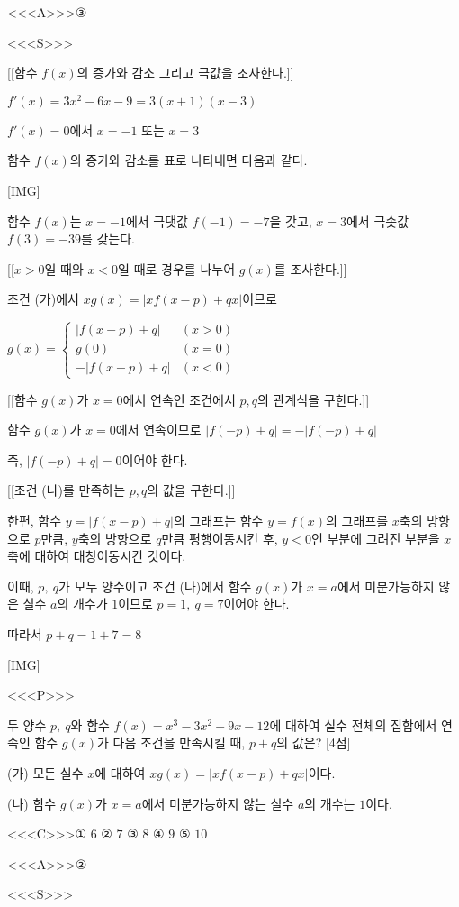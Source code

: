 \documentclass{oblivoir}
\begin{document}
<<<A>>>③

<<<S>>>

[[함수 $f(x)$의 증가와 감소 그리고 극값을 조사한다.]]

$f'(x)$$=3x^{2}-6x-9$$=3(x+1)(x-3)$

$f'(x)=0$에서 $x=-1$ 또는 $x=3$

함수 $f(x)$의 증가와 감소를 표로 나타내면 다음과 같다.

[IMG]

함수 $f(x)$는 $x=-1$에서 극댓값 $f(-1)=-7$을 갖고, $x=3$에서 극솟값 $f(3)=-39$를 갖는다.

[[$x>0$일 때와 $x<0$일 때로 경우를 나누어 $g(x)$를 조사한다.]]

조건 (가)에서 $xg(x)= | xf(x-p)+qx |$이므로

$g(x)=\begin{cases}
| f(x-p)+q |&(x>0)\\
g(0)&(x=0)\\
- | f(x-p)+q |&(x< 0)
\end{cases}$

[[함수 $g(x)$가 $x=0$에서 연속인 조건에서 $p,q$의 관계식을 구한다.]]

함수 $g(x)$가 $x=0$에서 연속이므로 $| f(-p)+q | =- | f(-p)+q |$

즉, $| f(-p)+q | =0$이어야 한다.

[[조건 (나)를 만족하는  $p,q$의 값을 구한다.]]

한편, 함수 $y= | f(x-p)+q |$의 그래프는 함수 $y=f(x)$의 그래프를 $x$축의 방향으로 $p$만큼, $y$축의 방향으로 $q$만큼 평행이동시킨 후, $y< 0$인 부분에 그려진 부분을 $x$축에 대하여 대칭이동시킨 것이다.

이때, $p,\:q$가 모두 양수이고 조건 (나)에서 함수 $g(x)$가 $x=a$에서 미분가능하지 않은 실수 $a$의 개수가 $1$이므로 $p=1,\:q=7$이어야 한다.

따라서 $p+q=1+7=8$

[IMG]

<<<P>>>

두 양수 $p,\: q$와 함수 $f(x)=x^{3}-3x^{2}-9x-12$에 대하여 실수 전체의 집합에서 연속인 함수 $g(x)$가 다음 조건을 만족시킬 때, $p+q$의 값은? [4점]

(가) 모든 실수 $x$에 대하여 $xg(x)= | xf(x-p)+qx |$이다.

(나) 함수 $g(x)$가 $x=a$에서 미분가능하지 않는 실수 $a$의 개수는 $1$이다.

<<<C>>>① $6$ ② $7$ ③ $8$ ④ $9$ ⑤ $10$

<<<A>>>②

<<<S>>>
\end{document}
